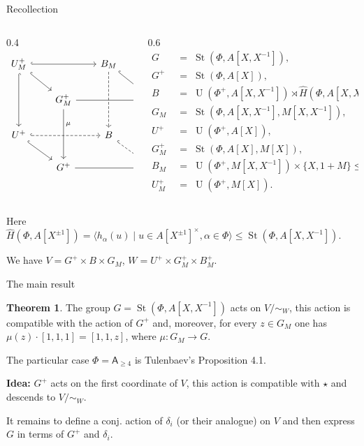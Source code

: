 \documentclass{beamer} %
\DeclareMathOperator{\St}{St}
\newcommand{\rA}{\mathsf{A}}
\newcommand{\StH}{\widehat{H}}
\DeclareMathOperator{\UU}{U}
\theoremstyle{definition}
\newtheorem*{thm}{Theorem}
\begin{document}
\begin{frame}[fragile]{Recollection}
\begin{columns}[T]
\begin{column}{0.4\textwidth}
\raggedleft
\scriptsize
\hspace*{0pt}%
\[
\begin{tikzcd}[row sep=1.8em, column sep=2.1em]
U^+_M
  \arrow[rr, hook]
  \arrow[dd, hook]
  \arrow[rd, hook]
&&
B_M
  \arrow[dd, dashed]
  \arrow[rd, hook]
& \\
&
G_M^+
  \arrow[rr]
  \arrow[dd, "\mu", pos=0.3]
&&
G_M
  \arrow[dd, "\mu"]
\\
U^+
  \arrow[rr, hook, dashed]
  \arrow[rd, hook]
&&
B
  \arrow[rd, hook, dashed]
& \\
&
G^+
  \arrow[rr]
&&
G
\end{tikzcd}
\]
\end{column}

\begin{column}{0.6\textwidth}
\raggedleft
\scriptsize
\[
\begin{aligned}
G \;&=\; \St(\Phi, A[X,X^{-1}]),\\
G^+ \;&=\; \St(\Phi, A[X]),\\
B \;&=\; \UU(\Phi^+, A[X,X^{-1}])
       \rtimes \StH(\Phi, A[X,X^{-1}]) \le G,\\
G_M \;&=\; \St(\Phi, A[X,X^{-1}], M[X,X^{-1}]),\\
U^+ \;&=\; \UU(\Phi^+, A[X]),\\
G_M^+ \;&=\; \St(\Phi, A[X], M[X]),\\
B_M \;&=\; \UU(\Phi^+, M[X,X^{-1}]) \times \{X,1+M\} \le G_M,\\
U_M^+ \;&=\; \UU(\Phi^+, M[X]).
\end{aligned}
\]
\end{column}
\end{columns}
\medbreak

\scriptsize { Here $\StH(\Phi, A[X^{\pm 1}]) = \langle h_\alpha(u) \mid u \in A[X^{\pm 1}]^\times, \alpha \in \Phi \rangle \leq \St(\Phi, A[X, X^{-1}])$. }
\pause

\scriptsize { We have $V = G^+ \times B \times G_M$, $W = U^+ \times G_M^+ \times B_M^+$. }
\end{frame}

\begin{frame}{The main result}
\begin{thm}
 The group $G = \St(\Phi, A[X, X^{-1}])$ acts on $V/\sim_W$, this action is compatible with the action of $G^+$ and, moreover, for every $z \in G_M$ one has $\mu(z) \cdot [1, 1, 1] = [1, 1, z]$, where $\mu \colon G_M \to G$.
\end{thm}
\pause The particular case $\Phi=\rA_{\geq 4}$ is Tulenbaev's Proposition 4.1.

\pause \textbf{Idea:} $G^+$ acts on the first coordinate of $V$, this action is compatible with $\star$ and descends to $V/\sim_W$.

\pause It remains to define a conj. action of $\delta_i$ (or their analogue) on $V$ and then express $G$ in terms of $G^+$ and $\delta_i$.
\end{frame}
\end{document}

